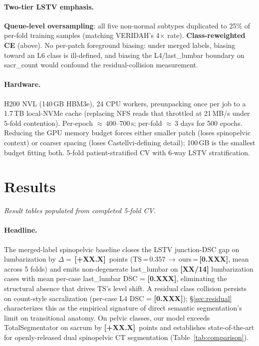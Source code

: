 \documentclass{article}
\newcommand{\TS}{TotalSegmentator}
\newcommand{\sota}{TS}
\newcommand{\VERIDAH}{VERIDAH}
\begin{document}
\paragraph{Two-tier LSTV emphasis.}
\textbf{Queue-level oversampling}: all five non-normal
subtypes duplicated to 25\% of per-fold training samples
(matching \VERIDAH{}'s 4$\times$ rate).
\textbf{Class-reweighted CE} (above). No per-patch
foreground biasing: under merged labels, biasing toward
an L6 class is ill-defined, and biasing the
L4/last\_lumbar boundary on sacr\_count would confound
the residual-collision measurement.

\paragraph{Hardware.}
H200 NVL (140\,GB HBM3e), 24 CPU workers, preunpacking
once per job to a 1.7\,TB local-NVMe cache (replacing NFS
reads that throttled at 21\,MB/s under 5-fold contention).
Per-epoch ${\approx}\,400$--$700$\,s; per-fold
${\approx}\,3$ days for 500 epochs. Reducing the GPU memory
budget forces either smaller patch (loses spinopelvic
context) or coarser spacing (loses Castellvi-defining
detail); 100\,GB is the smallest budget fitting both.
5-fold patient-stratified CV with 6-way LSTV
stratification.

\section{Results}
\label{sec:results}

\textit{Result tables populated from completed 5-fold CV.}

\paragraph{Headline.}
The merged-label spinopelvic baseline closes the LSTV
junction-DSC gap on lumbarization by
$\Delta{=}\,$\textbf{[+XX.X]}~points
(\sota{}\,=\,0.357\,$\to$\,ours\,=\,\textbf{[0.XXX]}, mean
across 5 folds) and emits non-degenerate last\_lumbar on
\textbf{[XX/14]} lumbarization cases with mean per-case
last\_lumbar DSC = \textbf{[0.XXX]}, eliminating the
structural absence that drives \sota{}'s level shift. A
residual class collision persists on count-style
sacralization (per-case L4 DSC = \textbf{[0.XXX]});
\S\ref{sec:residual} characterizes this as the empirical
signature of direct semantic segmentation's limit on
transitional anatomy. On pelvic classes, our model
exceeds \TS{} on sacrum by \textbf{[+XX.X]}~points and
establishes state-of-the-art for openly-released dual
spinopelvic CT segmentation (Table~\ref{tab:comparison}).
\end{document}

